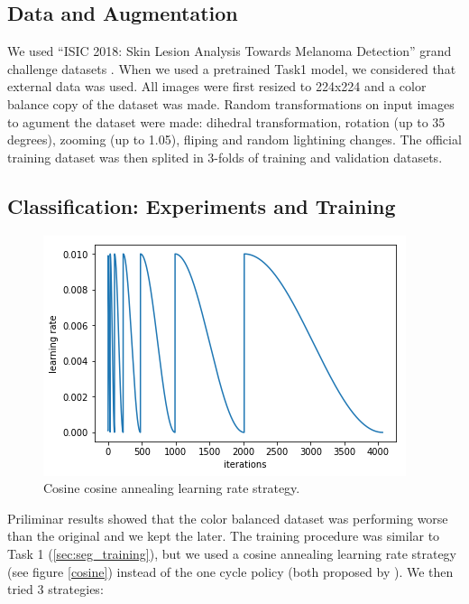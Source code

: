 \documentclass[conference]{IEEEtran}
\begin{document}
\subsection{Data and Augmentation}
We used “ISIC 2018: Skin Lesion Analysis Towards Melanoma Detection” grand challenge datasets \cite{codella, ham}. When we used a pretrained Task1 model, we considered that external data was used. All images were first resized to 224x224 and a color balance copy of the dataset was made. Random transformations on input images to agument the dataset were made: dihedral transformation, rotation (up to 35 degrees), zooming (up to 1.05), fliping and random lightining changes. The official training dataset was then splited in 3-folds of training and validation datasets.  


\subsection{Classification: Experiments and Training}
\begin{figure}[htbp]
\centerline{\includegraphics[width=.8\columnwidth]{cycle.png}}
\caption{Cosine cosine annealing learning rate strategy.}
\label{fig}
\end{figure}


Priliminar results showed that the color balanced dataset was performing worse than the original and we kept the later. The training procedure was similar to Task 1 (\ref{sec:seg_training}), but we used a cosine annealing learning rate strategy (see figure \ref{cosine}) instead of the one cycle policy (both proposed by \cite{leslie}). We then tried 3 strategies:
\end{document}
